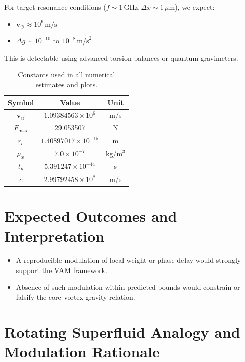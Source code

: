     For target resonance conditions (\( f \sim 1 \, \text{GHz}, \Delta x \sim 1 \, \mu\text{m} \)), we expect:
    \begin{itemize}
        \item \( \mathbf{v}_{\scriptscriptstyle\boldsymbol{\circlearrowleft}} \approx 10^6 \, \text{m/s} \)
        \item \( \Delta g \sim 10^{-10} \text{ to } 10^{-8} \, \text{m/s}^2 \)
    \end{itemize}
    This is detectable using advanced torsion balances or quantum gravimeters.

    \begin{table}[h!]
        \centering
        \begin{tabular}{|c|c|c|}
            \hline
            \textbf{Symbol} & \textbf{Value} & \textbf{Unit} \\
            \hline
            \( \mathbf{v}_{\scriptscriptstyle\boldsymbol{\circlearrowleft}} \) & \( 1.09384563 \times 10^6 \) & m/s \\
            \( F_{\text{max}} \) & 29.053507 & N \\
            \( r_c \) & \( 1.40897017 \times 10^{-15} \) & m \\
            \( \rho_\text{\ae} \) & \( 7.0 \times 10^{-7} \) & kg/m$^3$ \\
            \( t_p \) & \( 5.391247 \times 10^{-44} \) & s \\
            \( c \) & \( 2.99792458 \times 10^8 \) & m/s \\
            \hline
        \end{tabular}
        \caption{Constants used in all numerical estimates and plots.}
    \end{table}


    \section*{Expected Outcomes and Interpretation}
    \begin{itemize}
        \item A reproducible modulation of local weight or phase delay would strongly support the VAM framework.
        \item Absence of such modulation within predicted bounds would constrain or falsify the core vortex-gravity relation.
    \end{itemize}

    \section*{Rotating Superfluid Analogy and Modulation Rationale}

